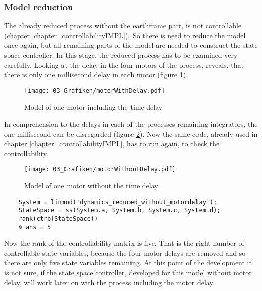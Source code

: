 \subsubsection{Model reduction}\label{chapter_ModelReductionIMPL}

The already reduced process without the earthframe part, is not controllable (chapter \ref{chapter_controllabilityIMPL}). So there is need to reduce the model once again, but all remaining parts of the model are needed to construct the state space controller. In this stage, the reduced process has to be examined very carefully. Looking at the delay in the four motors of the process, reveals, that there is only one millisecond delay in each motor (figure \ref{fig:motorWithDelay}).

\begin{figure}
	\centering
		\texttt{[image: 03\_Grafiken/motorWithDelay.pdf]}
	\caption{Model of one motor including the time delay}
	\label{fig:motorWithDelay}
\end{figure}

In comprehension to the delays in each of the processes remaining integrators, the one millisecond can be disregarded (figure \ref{fig:motorWithoutDelay}). Now the same code, already used in chapter \ref{chapter_controllabilityIMPL}, has to run again, to check the controllability.

\begin{figure}
	\centering
		\texttt{[image: 03\_Grafiken/motorWithoutDelay.pdf]}
	\caption{Model of one motor without the time delay}		
	\label{fig:motorWithoutDelay}
\end{figure}


\begin{lstlisting}
	System = linmod('dynamics_reduced_without_motordelay');
	StateSpace = ss(System.a, System.b, System.c, System.d);
	rank(ctrb(StateSpace))  
	% ans = 5                 
\end{lstlisting}

Now the rank of the controllability matrix is five. That is the right number of controllable state variables, because the four motor delays are removed and so there are only five state variables remaining. At this point of the development it is not sure, if the state space controller, developed for this model without motor delay, will work later on with the process including the motor delay.
